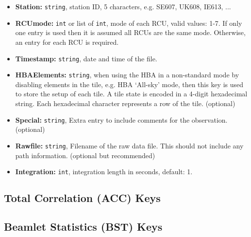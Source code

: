 \documentclass[10pt,a4paper]{article}
\begin{document}
\begin{itemize}
    \item \textbf{Station:} \texttt{string}, station ID, 5 characters, e.g.
    SE607, UK608, IE613, ...
    \item \textbf{RCUmode:} \texttt{int} or list of \texttt{int}, mode of each
    RCU, valid values: 1-7. If only one entry is used then it is assumed all
    RCUs are the same mode. Otherwise, an entry for each RCU is required.
    \item \textbf{Timestamp:} \texttt{string}, date and time of the file.
    \item \textbf{HBAElements:} \texttt{string}, when using the HBA in a
    non-standard mode by disabling elements in the tile, e.g. HBA `All-sky'
    mode, then this key is used to store the setup of each tile. A tile state is
    encoded in a 4-digit hexadecimal string. Each hexadecimal character
    represents a row of the tile. (optional)
    \item \textbf{Special:} \texttt{string}, Extra entry to include comments for
    the observation. (optional)
    \item \textbf{Rawfile:} \texttt{string}, Filename of the raw data file. This
    should not include any path information.
    (optional but recommended)
    \item \textbf{Integration:} \texttt{int}, integration length in seconds,
    default: 1.
\end{itemize}

\subsection{Total Correlation (ACC) Keys}

\subsection{Beamlet Statistics (BST) Keys}
\label{sec:bst_keys}
\end{document}

